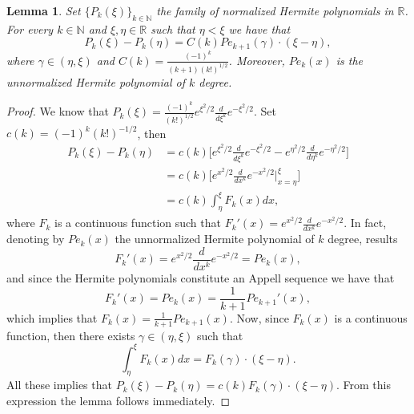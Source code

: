 \documentclass[]{interact}
\newcommand{\IR}{{\mathbb R}}
\newcommand{\IN}{{\mathbb N}}
\theoremstyle{plain}%
\newtheorem{lemma}[theorem]{Lemma}
\theoremstyle{definition}
\theoremstyle{remark}
\begin{document}
    \begin{lemma}\label{le-s3-1}
        Set $\{P_k(\xi)\}_{k\in \IN}$ the family of normalized Hermite 
        polynomials in $\IR$. For every $k\in\IN$ and 
        $\xi, \eta \in \IR$ such that
        $\eta<\xi$ we have that
        \begin{equation}
            \label{Pk-dif}
            P_k(\xi)-P_k(\eta)
                = C(k)  Pe_{k+1}(\gamma) 
                    \cdot (\xi-\eta), 
        \end{equation}
        where 
        $ \gamma\in (\eta,\xi)$ and 
        $C(k)=\frac{(-1)^k}{(k+1)(k!)^{1/2}} $.
        Moreover, $Pe_k(x)$ is the unnormalized Hermite polynomial of $k$ 
        degree.
    \end{lemma}
%
    \begin{proof}
             We know that
             $
                 P_k(\xi) = \frac{(-1)^k}{(k!)^{1/2}} 
                 e^{\xi^2/2}\frac{d}{d\xi^k}e^{-\xi^2/2}.
             $
             Set $c(k)=(-1)^k (k!)^{-1/2}$, then
            \begin{align*}
                P_k(\xi)-P_k(\eta)
                    &=c(k)
                    \Big[
                        e^{\xi^2/2}
                        \frac{d}{d\xi^k} e^{-\xi ^ 2/2} - e^{\eta^2/2}
                        \frac{d}{d\eta^k} e^{-\eta ^ 2/2}
                    \Big] 
                    \\
                & =c(k)
                    \Bigg[
                        e^{x^2/2} \frac{d}{dx^k} e^{-x^2/2}
                    \Big|_{x=\eta}^\xi\Bigg]
                    \\
                & = c(k) \int_{\eta}^\xi F_k(x) dx,
            \end{align*}
            where $F_k$ is a continuous function such that
            $F_k'(x) = e^{x^2/2}\frac{d}{dx^k}e^{-x^2/2}$. 
            In fact, denoting by $Pe_k(x)$ the
            unnormalized Hermite polynomial of $k$ degree, results
            $$
                F_k'(x)=e^{x^2/2}\frac{d}{dx^k}e^{-x^2/2}= Pe_k(x),
            $$
            and since the Hermite polynomials constitute an Appell sequence we 
            have that
            $$
                F_k'(x)=Pe_k(x)=\frac{1}{k+1} Pe_{k+1}'(x),
            $$
            which implies that $F_k(x)=\frac{1}{k+1} Pe_{k+1}(x)$. Now, since 
            $F_k(x)$ is a continuous function, then there exists
            $\gamma\in (\eta,\xi)$ such that
            $$
                \int_{\eta}^\xi F_k(x) dx = F_k(\gamma)\cdot (\xi-\eta).
            $$
            All these implies that
            $
                P_k(\xi)-P_k(\eta)= c(k) F_k(\gamma) \cdot (\xi-\eta).
            $
            From this expression the lemma follows immediately.
        \end{proof}
\end{document}
